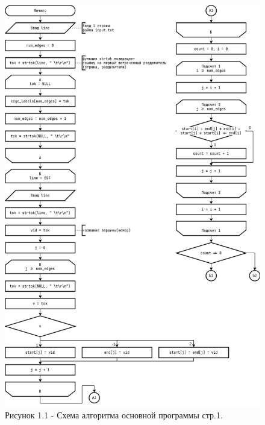 \documentclass[oneside,a4paper,14pt]{extarticle}
\begin{document}
\clearpage
\begin{figure}[H]
	\centering
	\includegraphics[height=0.9\textheight]{pics/flowchart1.png}
	\caption*{Рисунок 1.1 - Схема алгоритма основной программы стр.1.}
\end{figure}
\end{document}
